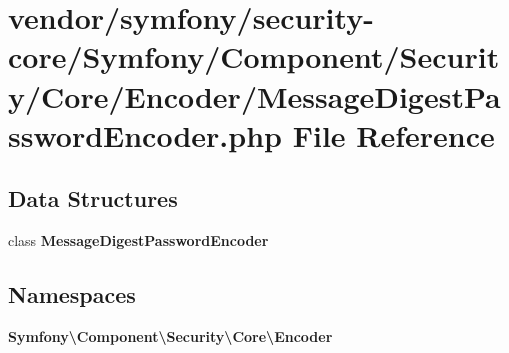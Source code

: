 \section{vendor/symfony/security-\/core/\+Symfony/\+Component/\+Security/\+Core/\+Encoder/\+Message\+Digest\+Password\+Encoder.php File Reference}
\label{_message_digest_password_encoder_8php}
\subsection*{Data Structures}
\begin{DoxyCompactItemize}
\item 
class {\bf Message\+Digest\+Password\+Encoder}
\end{DoxyCompactItemize}
\subsection*{Namespaces}
\begin{DoxyCompactItemize}
\item 
 {\bf Symfony\textbackslash{}\+Component\textbackslash{}\+Security\textbackslash{}\+Core\textbackslash{}\+Encoder}
\end{DoxyCompactItemize}
